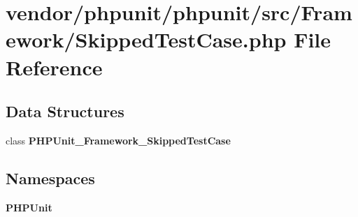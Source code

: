 \section{vendor/phpunit/phpunit/src/\+Framework/\+Skipped\+Test\+Case.php File Reference}
\label{_skipped_test_case_8php}
\subsection*{Data Structures}
\begin{DoxyCompactItemize}
\item 
class {\bf P\+H\+P\+Unit\+\_\+\+Framework\+\_\+\+Skipped\+Test\+Case}
\end{DoxyCompactItemize}
\subsection*{Namespaces}
\begin{DoxyCompactItemize}
\item 
 {\bf P\+H\+P\+Unit}
\end{DoxyCompactItemize}
